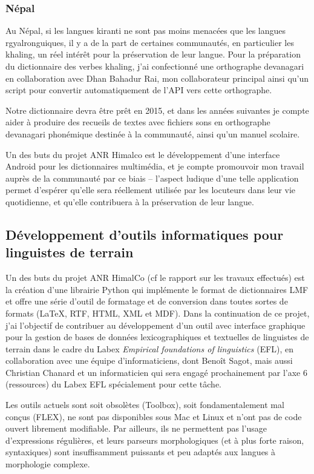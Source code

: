 \documentclass[oldfontcommands,oneside,a4paper,11pt]{article}
\begin{document}
\subsubsection{Népal}

Au Népal, si les langues kiranti ne sont pas moins menacées que les langues rgyalronguiques, il y a de la part de certaines communautés, en particulier les khaling, un réel intérêt pour la préservation de leur langue. Pour la préparation du dictionnaire des verbes khaling, j'ai confectionné une orthographe devanagari en collaboration avec Dhan Bahadur Rai, mon collaborateur principal ainsi qu'un script pour convertir automatiquement de l'API vers cette orthographe.

Notre dictionnaire devra être prêt en 2015, et dans les années suivantes je compte aider à produire des recueils de textes avec fichiers sons en orthographe devanagari phonémique destinée à la communauté, ainsi qu'un manuel scolaire. 

Un des buts du projet ANR Himalco est le développement d'une interface Android pour les dictionnaires multimédia, et je compte promouvoir mon travail auprès de la communauté par ce biais -- l'aspect ludique d'une telle application permet d'espérer qu'elle sera réellement utilisée par les locuteurs dans leur vie quotidienne, et qu'elle contribuera à la préservation de leur langue. 

\subsection{Développement d'outils informatiques pour linguistes de terrain} \label{sec:outils}
Un des buts du projet ANR HimalCo (cf le rapport sur les travaux effectués) est   la création d'une librairie Python qui implémente le format de dictionnaires LMF et offre une série d'outil de formatage et de conversion dans toutes sortes de formats (\LaTeX, RTF, HTML, XML et MDF). Dans la continuation de ce projet, j'ai l'objectif de contribuer au développement d'un outil avec interface graphique pour la gestion de bases de données lexicographiques et textuelles de linguistes de terrain dans le cadre du Labex \textit{Empirical foundations of linguistics} (EFL), en collaboration avec une équipe d'informaticiens, dont Benoît Sagot, mais aussi Christian Chanard et un informaticien qui sera engagé prochainement par l'axe 6 (ressources) du Labex EFL spécialement pour cette tâche. 

Les outils actuels sont soit obsolètes (Toolbox), soit fondamentalement mal conçus (FLEX), ne sont pas disponibles sous Mac et Linux et n'ont pas de code ouvert librement modifiable. Par ailleurs, ils ne permettent pas l'usage d'expressions régulières, et leurs parseurs morphologiques (et à plus forte raison, syntaxiques) sont insuffisamment puissants et peu adaptés aux langues à morphologie complexe. 
\end{document}
